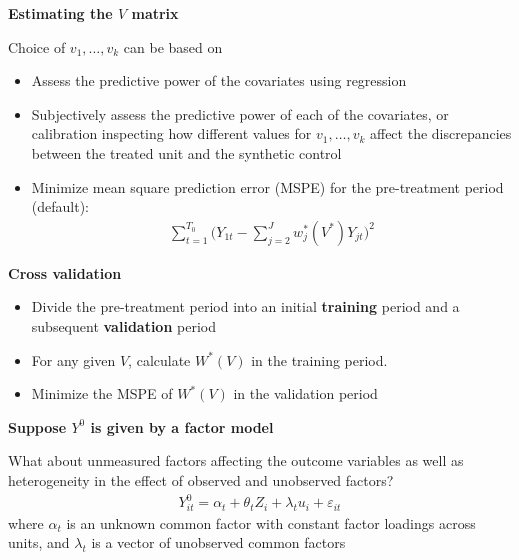 \documentclass[notes=show]{beamer}
\begin{document}
\begin{frame}[plain]
	\begin{center}
	\textbf{Estimating the $V$ matrix}
	\end{center}
	
 Choice of $v_1, \dots, v_k$ can be based on
		\begin{itemize}
		\item Assess the predictive power of the covariates using regression
		\item Subjectively assess the predictive power of each of the covariates, or calibration inspecting how different values for $v_1, \dots, v_k$ affect the discrepancies between the treated unit and the synthetic control
		\item Minimize mean square prediction error (MSPE) for the pre-treatment period (default):
			\begin{eqnarray*}
			\sum_{t=1}^{T_0} \bigg(Y_{1t} - \sum_{j=2}^J w_j^*(V^*)Y_{jt} \bigg)^2
			\end{eqnarray*}
		\end{itemize}
\end{frame}

\begin{frame}[plain]
\begin{center}
\textbf{Cross validation}
\end{center}

\begin{itemize}
		\item Divide the pre-treatment period into an initial \textbf{training} period and a subsequent \textbf{validation} period
		\item For any given $V$, calculate $W^*(V)$ in the training period.
		\item Minimize the MSPE of $W^*(V)$ in the validation period
\end{itemize}

\end{frame}


\begin{frame}[plain]
\begin{center}
\textbf{Suppose $Y^0$ is given by a factor model}
\end{center}

What about unmeasured factors affecting the outcome variables as well as heterogeneity in the effect of observed and unobserved factors?
\begin{eqnarray*}
Y_{it}^0 = \alpha_t + \theta_t Z_i + \lambda_t u_i + \varepsilon_{it}
\end{eqnarray*}where $\alpha_t$ is an unknown common factor with constant factor loadings across units, and $\lambda_t$ is a vector of unobserved common factors

\end{frame}
\end{document}

